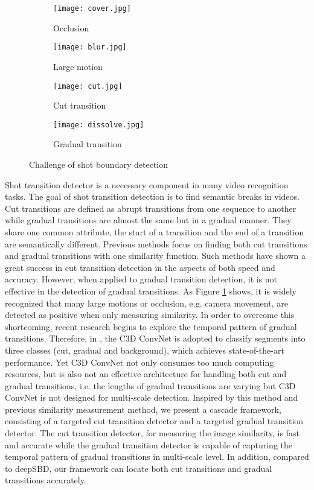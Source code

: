 \documentclass[runningheads]{llncs}
\begin{document}
\begin{figure}

\begin{subfigure}[b]{1.0\textwidth}
\centering
\texttt{[image: cover.jpg]}
\caption{Occlusion}
\end{subfigure}
\begin{subfigure}[b]{1.0\textwidth}
\centering
\texttt{[image: blur.jpg]}
\caption{Large motion}
\end{subfigure}
\begin{subfigure}[b]{1.0\textwidth}
\centering
\texttt{[image: cut.jpg]}
\caption{Cut transition}
\end{subfigure}
\centering
\begin{subfigure}[b]{1.0\textwidth}
\centering
\texttt{[image: dissolve.jpg]}
\caption{Gradual transition}
\end{subfigure}

\caption{Challenge of shot boundary detection}\label{fig:1}
\end{figure}

Shot transition detector is a necessary component in many video recognition tasks. The goal of shot transition detection is to find semantic breaks in videos. Cut transitions are defined as abrupt transitions from one sequence to another while gradual transitions are almost the same but in a gradual manner. They share one common attribute, the start of a transition and the end of a transition are semantically different. Previous methods focus on finding both cut transitions and gradual transitions with one similarity function.\cite{yusoff2000video,yuan2005unified} Such methods have shown a great success in cut transition detection in the aspects of both speed and accuracy. However, when applied to gradual transition detection, it is not effective in the detection of gradual transitions. As Figure \ref{fig:1} shows, it is  widely recognized that many large motions or occlusion, e.g. camera movement, are detected as positive when only measuring similarity. In order to overcome this shortcoming, recent research\cite{lu2013fast,hassanien2017large} begins to explore the temporal pattern of gradual transitions. Therefore, in \cite{hassanien2017large}, the C3D ConvNet is adopted to classify segments into three classes (cut, gradual and background), which achieves state-of-the-art performance. Yet C3D ConvNet not only consumes too much computing resources, but is also not an effective architecture for handling both cut and gradual transitions, i.e. the lengths of gradual transitions are varying but C3D ConvNet is not designed for multi-scale detection. Inspired by this method and previous similarity measurement method, we present a cascade framework, consisting of a targeted cut transition detector and a targeted gradual transition detector. The cut transition detector, for measuring the image similarity, is fast and accurate while the gradual transition detector is capable of capturing the temporal pattern of gradual transitions in multi-scale level. In addition, compared to deepSBD, our framework can locate both cut transitions and gradual transitions accurately.
\end{document}
